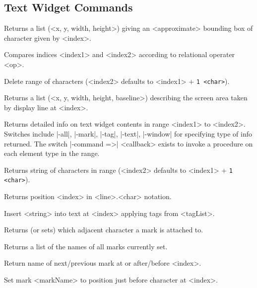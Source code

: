 \subsection*{Text Widget Commands}
\begin{enum}{1cm}

Returns a list (<x, y, width, height>)  giving an <approximate> 
bounding box of character given by <index>.

Compares indices <index1> and <index2> according to relational operater <op>.

Delete range of characters (<index2> defaults to <index1> $+$ {\tt 1 <char>}).

Returns a list (<x, y, width, height, baseline>) describing the screen area 
taken by display line at <index>.

Returns detailed info on text widget contents in range <index1> to <index2>.
Switches include |-all|, |-mark|, |-tag|, |-text|, |-window| for specifying
type of info returned. The switch |-command =>| <callback> exists to invoke
a procedure on each element type in the range.

Returns string of characters in range (<index2> defaults to <index1> $+$ {\tt 1 <char>}).

Returns position <index> in <line>.<char> notation.

Insert <string> into text at <index> applying tags from <tagList>.

Returns (or sets) which adjacent character a mark is attached to.

Returns a list of the names of all marks currently set.

Return name of next/previous mark at or after/before <index>.

Set mark <markName> to position just before character at <index>.


\end{enum}
